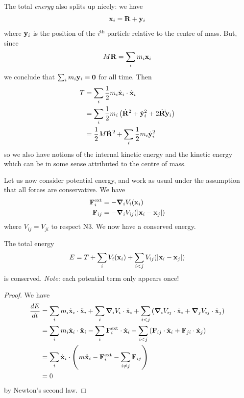 \documentclass{../../template/note}
\begin{document}
    The total \emph{energy} also splits up nicely: we have
    \begin{align*}
        \V x_i = \V R + \V y_i
    \end{align*}
    where \(\V y_i\) is the position of the \(i^\text{th}\) particle relative to the centre of mass. But, since
    \begin{align}
        M\V R = \sum_i m_i \V x_i
    \end{align}
    we conclude that \(\sum_i m_i \V y_i = \V 0\) for all time. Then
    \begin{align}
        T &= \sum_i \frac 1 2 m_i \dot{\V x}_i \cdot \dot{\V x}_i \\
        &= \sum_i \frac 1 2 m_i \left(\dot{\V R}^2 + \dot{\V y}_i^2 + 2 \dot{\V R} \dot \dot{\V y}_i\right) \\
        &= \frac 1 2 M \dot{\V R}^2 + \sum_i \frac 1 2 m_i \dot{\V y}_i^2
    \end{align}
    so we also have notions of the internal kinetic energy and the kinetic energy which can be in some sense attributed to the centre of mass.

    Let us now consider potential energy, and work as usual under the assumption that all forces are conservative. We have
    \begin{align*}
        \V F_i^\text{ext} &= -\grad_i V_i(\V x_i) \\
        \V F_{ij} &= -\grad_i V_{ij}(|\V x_i - \V x_j|)
    \end{align*}
    where \(V_{ij} = V_{ji}\) to respect N3. We now have a conserved energy.

    \begin{proposition}
        The total energy
        \begin{align*}
            E = T + \sum_i V_i(\V x_i) + \sum_{i < j} V_{ij} (|\V x_i - \V x_j|)
        \end{align*}
        is conserved. \emph{Note:} each potential term only appears once!        
    \end{proposition}
    
    \begin{proof}
        We have
        \begin{align*}
            \frac{dE}{dt} &= \sum_i m_i \dot{\V x}_i \cdot \ddot{\V x}_i + \sum_i \grad_i V_i \cdot \dot{\V x}_i + \sum_{i < j}\left(\grad_i V_{ij} \cdot \dot{\V x}_i + \grad_j V_{ij} \cdot \dot{\V x}_j\right) \\
            &= \sum_i m_i \dot{\V x}_i \cdot \ddot{\V x}_i - \sum_i \V F_i^\text{ext} \cdot \dot{\V x}_i - \sum_{i < j} \left(\V F_{ij} \cdot \dot{\V x}_i + \V F_{ji} \cdot \dot{\V x}_j\right) \\
            &= \sum_i \dot{\V x}_i \cdot \left(m \ddot{\V x}_i - \V F_i^\text{ext} - \sum_{i \neq j} \V F_{ij} \right) \\
            &= 0
        \end{align*}
        by Newton's second law.
    \end{proof}
    
\end{document}
